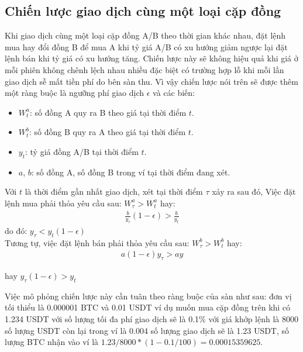 \subsection{Chiến lược giao dịch cùng một loại cặp đồng}\label{describe_strategy_1}
Khi giao dịch cùng một loại cặp đồng A/B theo thời gian khác nhau, đặt lệnh mua hay đổi đồng B để mua A khi tỷ giá A/B có xu hướng giảm ngược lại đặt lệnh bán khi tỷ giá có xu hướng tăng. Chiến lược này sẽ không hiệu quả khi giá ở mỗi phiên không chênh lệch nhau nhiều đặc biệt có trường hợp lỗ khi mỗi lần giao dịch sễ mất tiền phí do bên sàn thu. Vì vậy chiến lược nói trên sẽ được thêm một ràng buộc là  ngưỡng phí giao dịch $\epsilon$ và các biến:
\begin{itemize}
	\item $W^a_t$: số đồng A quy ra B theo giá tại thời điểm $t$.
	\item $W^b_t$: số đồng B quy ra A theo giá tại thời điểm $t$.
	\item $y_t$: tỷ giá đồng A/B tại thời điểm $t$.
	\item $a$, $b$: số đồng A, số đồng B trong ví tại thời điểm đang xét.
\end{itemize}
Với $t$ là thời điểm gần nhất giao dịch, xét tại thời điểm $\tau$ xảy ra sau đó, Việc đặt lệnh mua phải thỏa yêu cầu sau:
$W^a_\tau > W^a_t$ hay:
\begin{align}
\frac{b}{y_\tau}(1-\epsilon) > \frac{b}{y_t}   
\end{align}
do đó: $y_\tau < y_t(1 -\epsilon)$  \\
Tương tự, việc đặt lệnh bán phải thỏa yêu cầu sau:
$W^b_\tau > W^b_t$ hay:
\begin{align}
a (1 - \epsilon) y_\tau > ay   
\end{align}



hay $y_\tau(1 -\epsilon) > y_t $

Việc mô phỏng chiến lược này cần tuân theo ràng buộc của sàn như sau: đơn vị tối thiểu là 0.000001 BTC và 0.01 USDT ví dụ muốn mua cặp đồng trên khi có 1.234 USDT với số lượng tối đa phí giao dịch sẽ là 0.1\% với giá khớp lệnh là 8000 số lượng USDT còn lại trong ví là 0.004 số lượng giao dịch sẽ là 1.23 USDT, số lượng BTC nhận vào ví là $1.23/8000*(1-0.1/100) = 0.00015359625$.



